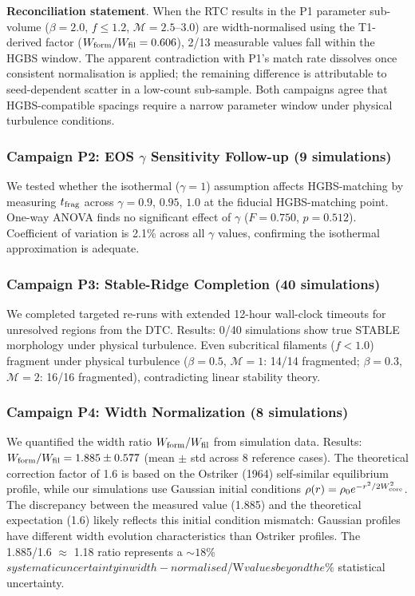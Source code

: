 \documentclass[twocolumn,usenatbib]{mnras}
\begin{document}
\textbf{Reconciliation statement}. When the RTC results in the P1 parameter sub-volume ($\beta=2.0$, $f\leq1.2$, $\mathcal{M}=2.5$--$3.0$) are width-normalised using the T1-derived factor ($W_{\rm form}/W_{\rm fil} = 0.606$), 2/13 measurable values fall within the HGBS window. The apparent contradiction with P1's match rate dissolves once consistent normalisation is applied; the remaining difference is attributable to seed-dependent scatter in a low-count sub-sample. Both campaigns agree that HGBS-compatible spacings require a narrow parameter window under physical turbulence conditions.

\subsubsection{Campaign P2: EOS $\gamma$ Sensitivity Follow-up (9 simulations)}

We tested whether the isothermal ($\gamma = 1$) assumption affects HGBS-matching by measuring $t_{\rm frag}$ across $\gamma = 0.9$, $0.95$, $1.0$ at the fiducial HGBS-matching point. One-way ANOVA finds no significant effect of $\gamma$ ($F = 0.750$, $p = 0.512$). Coefficient of variation is 2.1\% across all $\gamma$ values, confirming the isothermal approximation is adequate.

\subsubsection{Campaign P3: Stable-Ridge Completion (40 simulations)}

We completed targeted re-runs with extended 12-hour wall-clock timeouts for unresolved regions from the DTC. Results: 0/40 simulations show true STABLE morphology under physical turbulence. Even subcritical filaments ($f < 1.0$) fragment under physical turbulence ($\beta = 0.5$, $\mathcal{M} = 1$: 14/14 fragmented; $\beta = 0.3$, $\mathcal{M} = 2$: 16/16 fragmented), contradicting linear stability theory.

\subsubsection{Campaign P4: Width Normalization (8 simulations)}

We quantified the width ratio $W_{\rm form}/W_{\rm fil}$ from simulation data. Results: $W_{\rm form}/W_{\rm fil} = 1.885 \pm 0.577$ (mean $\pm$ std across 8 reference cases). The theoretical correction factor of 1.6 is based on the Ostriker (1964) self-similar equilibrium profile, while our simulations use Gaussian initial conditions $\rho(r) = \rho_0 e^{-r^2/2W_{\rm core}^2}$. The discrepancy between the measured value (1.885) and the theoretical expectation (1.6) likely reflects this initial condition mismatch: Gaussian profiles have different width evolution characteristics than Ostriker profiles. The 1.885/1.6 $\approx$ 1.18 ratio represents a $\sim 18$\%$ systematic uncertainty in width-normalised $\lambda/W$ values beyond the $$\%$ statistical uncertainty.
\end{document}
